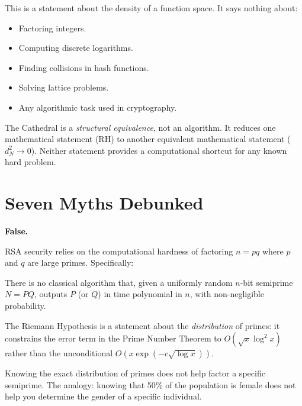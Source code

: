 \documentclass[11pt,a4paper]{article}
\begin{document}
This is a statement about the density of a function space. It says
nothing about:
\begin{itemize}
  \item Factoring integers.
  \item Computing discrete logarithms.
  \item Finding collisions in hash functions.
  \item Solving lattice problems.
  \item Any algorithmic task used in cryptography.
\end{itemize}

The Cathedral is a \emph{structural equivalence}, not an algorithm.
It reduces one mathematical statement (RH) to another equivalent
mathematical statement ($d_N^2 \to 0$). Neither statement provides
a computational shortcut for any known hard problem.

\section{Seven Myths Debunked}
\label{sec:myths}

\begin{myth}
\label{myth:rsa}
\textbf{False.}
\end{myth}

RSA security relies on the computational hardness of factoring
$n = pq$ where $p$ and $q$ are large primes. Specifically:

\begin{definition}
There is no classical algorithm that, given a uniformly random
$n$-bit semiprime $N = PQ$, outputs $P$ (or $Q$) in time
polynomial in $n$, with non-negligible probability.
\end{definition}

The Riemann Hypothesis is a statement about the \emph{distribution}
of primes: it constrains the error term in the Prime Number Theorem
to $O(\sqrt{x}\log^2 x)$ rather than the unconditional
$O(x\exp(-c\sqrt{\log x}))$.

\begin{claim}
\label{claim:separation}
Knowing the exact distribution of primes does not help factor a
specific semiprime. The analogy: knowing that 50\% of the population
is female does not help you determine the gender of a specific
individual.
\end{claim}
\end{document}
